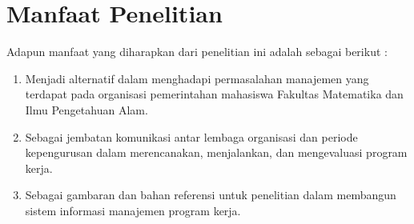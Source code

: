 \section{Manfaat Penelitian}
Adapun manfaat yang diharapkan dari penelitian ini adalah sebagai berikut :
	\begin{enumerate}
		\item Menjadi alternatif dalam menghadapi permasalahan manajemen yang terdapat pada organisasi pemerintahan mahasiswa Fakultas Matematika dan Ilmu Pengetahuan Alam.
		\item Sebagai jembatan komunikasi antar lembaga organisasi dan periode kepengurusan dalam merencanakan, menjalankan, dan mengevaluasi program kerja.
		\item Sebagai gambaran dan bahan referensi untuk penelitian dalam membangun sistem informasi manajemen program kerja.   	
	\end{enumerate}
		
\begin{comment}

\end{comment}
